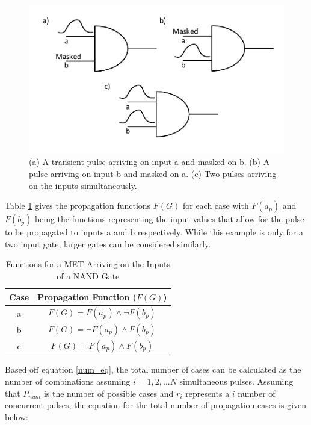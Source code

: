 \begin{figure}[!htbp]
	\centering
	\includegraphics[width=0.80\linewidth]{Figures/Prop_MET}
	\caption{(a) A transient pulse arriving on input a and masked on b. (b) A pulse arriving on input b and masked on a. (c) Two pulses arriving on the inputs simultaneously.}
	\label{Prop_MET}
\end{figure}

Table \ref{table:prop_table} gives the propagation functions $F(G)$ for each case with $F(a_p)$ and $F(b_p)$ being the functions representing the input values that allow for the pulse to be propagated to inputs a and b respectively. While this example is only for a two input gate, larger gates can be considered similarly.

\begin{table}[ht]
	\begin{center}
		\caption{Functions for a MET Arriving on the Inputs of a NAND Gate}
		\label{table:prop_table}
		\begin{tabular}{|c|c|}
			\hline
			Case & Propagation Function ($F(G)$) \\ 
			\hline
			a & $F(G) = F(a_p) \land \lnot F(b_p)$ \\
			\hline
			b & $F(G) = \lnot F(a_p) \land F(b_p)$ \\
			\hline
			c & $F(G) = F(a_p) \land F(b_p)$ \\
			\hline
		\end{tabular}
	\end{center}
\end{table}

Based off equation \ref{num_eq}, the total number of cases can be calculated as the number of combinations assuming $i = 1,2,...N$ simultaneous pulses. Assuming that $P_{num}$ is the number of possible cases and $r_i$ represents a $i$ number of concurrent pulses, the equation for the total number of propagation cases is given below:

